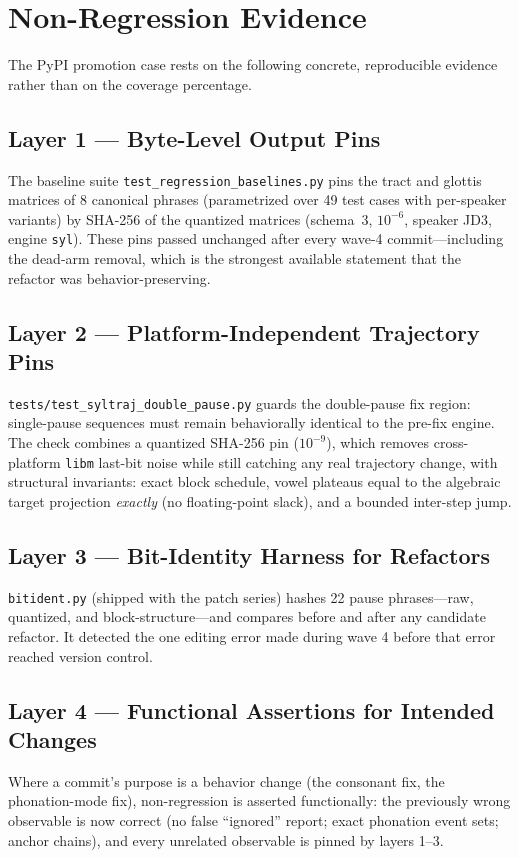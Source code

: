 \documentclass[11pt,a4paper]{article}
\newcommand{\code}[1]{\texttt{#1}}
\begin{document}
\section{Non-Regression Evidence}
\label{sec:nonregression}

The PyPI promotion case rests on the following concrete, reproducible
evidence rather than on the coverage percentage.

\subsection{Layer 1 --- Byte-Level Output Pins}
The baseline suite \code{test\_regression\_baselines.py} pins the
tract and glottis matrices of 8 canonical phrases (parametrized over 49 test cases with
per-speaker variants) by SHA-256 of the quantized matrices (schema~3,
$10^{-6}$, speaker JD3, engine \code{syl}). These pins passed
unchanged after every wave-4 commit---including the dead-arm removal,
which is the strongest available statement that the refactor was
behavior-preserving.

\subsection{Layer 2 --- Platform-Independent Trajectory Pins}
\code{tests/test\_syltraj\_double\_pause.py} guards the double-pause
fix region: single-pause sequences must remain behaviorally identical
to the pre-fix engine. The check combines a quantized SHA-256 pin
($10^{-9}$), which removes cross-platform \code{libm} last-bit noise
while still catching any real trajectory change, with structural
invariants: exact block schedule, vowel plateaus equal to the
algebraic target projection \emph{exactly} (no floating-point slack),
and a bounded inter-step jump.

\subsection{Layer 3 --- Bit-Identity Harness for Refactors}
\code{bitident.py} (shipped with the patch series) hashes 22 pause
phrases---raw, quantized, and block-structure---and compares before
and after any candidate refactor. It detected the one editing error
made during wave 4 before that error reached version control.

\subsection{Layer 4 --- Functional Assertions for Intended Changes}
Where a commit's purpose is a behavior change (the consonant fix, the
phonation-mode fix), non-regression is asserted functionally: the
previously wrong observable is now correct (no false ``ignored''
report; exact phonation event sets; anchor chains), and every
unrelated observable is pinned by layers 1--3.
\end{document}
